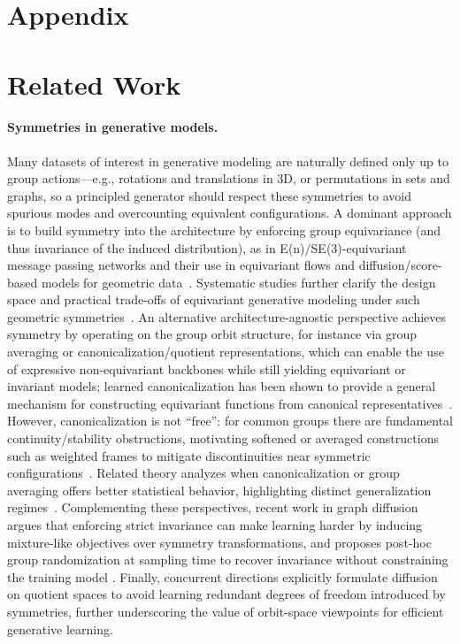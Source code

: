 \documentclass{article}
\theoremstyle{plain}
\theoremstyle{definition}
\theoremstyle{remark}
\newcommand{\1}{\mathbf{1}}
\begin{document}
\section*{Appendix}

\section{Related Work}


\paragraph{Symmetries in generative models.} Many datasets of interest in generative modeling are naturally defined only up to group actions—e.g., rotations and translations in 3D, or permutations in sets and graphs, so a principled generator should respect these symmetries to avoid spurious modes and overcounting equivalent configurations. A dominant approach is to build symmetry into the architecture by enforcing group equivariance (and thus invariance of the induced distribution), as in E(n)/SE(3)-equivariant message passing networks and their use in equivariant flows and diffusion/score-based models for geometric data~\citep{satorras2021n, garcia2021n, hoogeboom2022equivariant}. Systematic studies further clarify the design space and practical trade-offs of equivariant generative modeling under such geometric symmetries~\cite{le2023navigating,lawrence2025improving}. An alternative architecture-agnostic perspective achieves symmetry by operating on the group orbit structure, for instance via group averaging or canonicalization/quotient representations, which can enable the use of expressive non-equivariant backbones while still yielding equivariant or invariant models; learned canonicalization has been shown to provide a general mechanism for constructing equivariant functions from canonical representatives~\cite{kaba2023canonical}. However, canonicalization is not “free”: for common groups there are fundamental continuity/stability obstructions, motivating softened or averaged constructions such as weighted frames to mitigate discontinuities near symmetric configurations~\cite{dym2024equivariant}. Related theory analyzes when canonicalization or group averaging offers better statistical behavior, highlighting distinct generalization regimes~\cite{tahmasebi2025generalization}. Complementing these perspectives, recent work in graph diffusion argues that enforcing strict invariance can make learning harder by inducing mixture-like objectives over symmetry transformations, and proposes post-hoc group randomization at sampling time to recover invariance without constraining the training model \cite{yan2023swingnn}. Finally, concurrent directions explicitly formulate diffusion on quotient spaces to avoid learning redundant degrees of freedom introduced by symmetries, further underscoring the value of orbit-space viewpoints for efficient generative learning\cite{quotientspace}.
\end{document}
